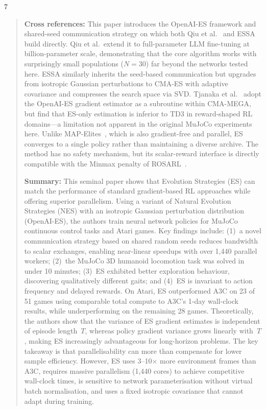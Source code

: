 \documentclass[12pt, a4paper]{article}
\begin{document}
\begin{thebibliography}{7}
\begin{quotation}
\textbf{Cross references:} This paper introduces the OpenAI-ES framework and shared-seed communication strategy on which both Qiu et al.~\cite{qiu2026evolution} and ESSA~\cite{korotyshova2025essa} build directly. Qiu et al.\ extend it to full-parameter LLM fine-tuning at billion-parameter scale, demonstrating that the core algorithm works with surprisingly small populations ($N{=}30$) far beyond the networks tested here. ESSA similarly inherits the seed-based communication but upgrades from isotropic Gaussian perturbations to CMA-ES with adaptive covariance and compresses the search space via SVD. Tjanaka et al.~\cite{tjanaka2022approximating} adopt the OpenAI-ES gradient estimator as a subroutine within CMA-MEGA, but find that ES-only estimation is inferior to TD3 in reward-shaped RL domains---a limitation not apparent in the original MuJoCo experiments here. Unlike MAP-Elites~\cite{mouret2015illuminating}, which is also gradient-free and parallel, ES converges to a single policy rather than maintaining a diverse archive. The method has no safety mechanism, but its scalar-reward interface is directly compatible with the Minmax penalty of ROSARL~\cite{nanguetasse2024rosarl}.

\textbf{Summary:} This seminal paper shows that Evolution Strategies (ES) can match the performance of standard gradient-based RL approaches while offering superior parallelism. Using a variant of Natural Evolution Strategies (NES) with an isotropic Gaussian perturbation distribution (OpenAI-ES), the authors train neural network policies for MuJoCo continuous control tasks and Atari games. Key findings include: (1)~a novel communication strategy based on shared random seeds reduces bandwidth to scalar exchanges, enabling near-linear speedups with over 1,440 parallel workers; (2)~the MuJoCo 3D humanoid locomotion task was solved in under 10 minutes; (3)~ES exhibited better exploration behaviour, discovering qualitatively different gaits; and (4)~ES is invariant to action frequency and delayed rewards. On Atari, ES outperformed A3C on 23 of 51 games using comparable total compute to A3C's 1-day wall-clock results, while underperforming on the remaining 28 games. Theoretically, the authors show that the variance of ES gradient estimates is independent of episode length~$T$, whereas policy gradient variance grows linearly with~$T$, making ES increasingly advantageous for long-horizon problems. The key takeaway is that parallelisability can more than compensate for lower sample efficiency. However, ES uses 3--10$\times$ more environment frames than A3C, requires massive parallelism (1,440 cores) to achieve competitive wall-clock times, is sensitive to network parameterisation without virtual batch normalisation, and uses a fixed isotropic covariance that cannot adapt during training.
\end{quotation}


\end{thebibliography}
\end{document}
